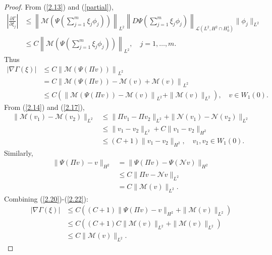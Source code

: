 \documentclass{article}
\numberwithin{equation}{section}
\begin{document}
\begin{proof}
    From (\ref{2.13}) and (\ref{partial}),
    \begin{align*}
        \left|\frac{\partial\Gamma}{\partial\xi_j}\right|&\le \left\|\mathcal{M}\left(\Psi\left(\sum_{j=1}^{m}\xi_j \phi_j\right)\right)\right\|_{L^{2}}\left\|D\Psi \left(\sum_{j=1}^{m}\xi_j \phi_j\right)\right\|_{\mathcal{L}(L^{2},H^2\cap H_0^1)}\|\phi_j\|_{L^{2}}\\
        &\le C\left\|\mathcal{M}\left(\Psi\left(\sum_{j=1}^{m}\xi_j \phi_j\right)\right)\right\|_{L^{2}},\quad j=1,\dots,m.
    \end{align*}
    Thus
    \begin{equation}
        \begin{aligned}
            |\nabla\Gamma(\xi)|&\le C\left\|\mathcal{M}\left(\Psi\left(\Pi v\right)\right)\right\|_{L^{2}}\\
            &=C\left\|\mathcal{M}\left(\Psi\left(\Pi v\right)\right)-\mathcal{M}(v)+\mathcal{M}(v)\right\|_{L^{2}}\\
            &\le C\left(\left\|\mathcal{M}\left(\Psi\left(\Pi v\right)\right)-\mathcal{M}(v)\right\|_{L^{2}}+\|\mathcal{M}(v)\|_{L^{2}}\right),\quad v\in W_1(0).
        \end{aligned}\label{2.20}
    \end{equation}
    From (\ref{2.14}) and (\ref{2.17}),
    \begin{equation}
        \begin{aligned}
            \|\mathcal{M}(v_1)-\mathcal{M}(v_2)\|_{L^{2}}&\le \|\Pi v_1-\Pi v_2\|_{L^{2}}+\|\mathcal{N}(v_1)-\mathcal{N}(v_2)\|_{L^{2}}\\
            &\le \|v_1-v_2\|_{L^{2}}+C\|v_1-v_2\|_{H^2}\\
            &\le (C+1)\|v_1-v_2\|_{H^2},\quad v_1,v_2\in W_1(0).
        \end{aligned}\label{2.21}
    \end{equation}
    Similarly,
    \begin{equation}
        \begin{aligned}
            \|\Psi(\Pi v)-v\|_{H^2}&=\|\Psi(\Pi v)-\Psi(\mathcal{N}v)\|_{H^2}\\
            &\le C\|\Pi v-\mathcal{N}v\|_{L^{2}}\\
            &=C\|\mathcal{M}(v)\|_{L^{2}}.
        \end{aligned}\label{2.22}
    \end{equation}
    Combining (\ref{2.20})-(\ref{2.22}):
    \begin{equation}
        \begin{aligned}
            |\nabla\Gamma(\xi)|&\le C\left((C+1)\|\Psi(\Pi v)-v\|_{H^2}+\|\mathcal{M}(v)\|_{L^{2}}\right)\\
            &\le C\left((C+1)C\|\mathcal{M}(v)\|_{L^{2}}+\|\mathcal{M}(v)\|_{L^{2}}\right)\\
            &\le C\|\mathcal{M}(v)\|_{L^{2}}.
        \end{aligned}\label{2.23}
    \end{equation}


\end{proof}
\end{document}
